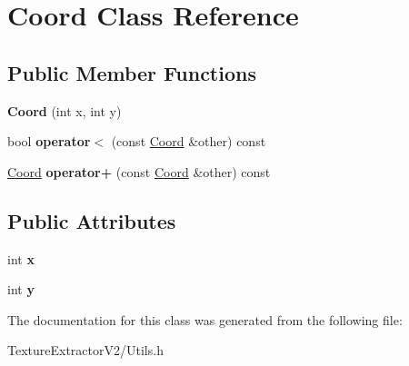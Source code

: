 \hypertarget{class_coord}{}\section{Coord Class Reference}
\label{class_coord}
\subsection*{Public Member Functions}
\begin{DoxyCompactItemize}
\item 
\hypertarget{class_coord_a31640ee494a7c77331cc56de54894301}{}{\bfseries Coord} (int x, int y)\label{class_coord_a31640ee494a7c77331cc56de54894301}

\item 
\hypertarget{class_coord_a69648c0fa3e43e9d7e466ff9d35b4b45}{}bool {\bfseries operator$<$} (const \hyperlink{class_coord}{Coord} \&other) const \label{class_coord_a69648c0fa3e43e9d7e466ff9d35b4b45}

\item 
\hypertarget{class_coord_a92ea8fd4ba7072c4d4dfad64647d44a7}{}\hyperlink{class_coord}{Coord} {\bfseries operator+} (const \hyperlink{class_coord}{Coord} \&other) const \label{class_coord_a92ea8fd4ba7072c4d4dfad64647d44a7}

\end{DoxyCompactItemize}
\subsection*{Public Attributes}
\begin{DoxyCompactItemize}
\item 
\hypertarget{class_coord_a696eaa744360fc791d0e3b331c549dbe}{}int {\bfseries x}\label{class_coord_a696eaa744360fc791d0e3b331c549dbe}

\item 
\hypertarget{class_coord_a214166cca70cef7dda9201689c3e81ab}{}int {\bfseries y}\label{class_coord_a214166cca70cef7dda9201689c3e81ab}

\end{DoxyCompactItemize}


The documentation for this class was generated from the following file\+:\begin{DoxyCompactItemize}
\item 
Texture\+Extractor\+V2/Utils.\+h\end{DoxyCompactItemize}
